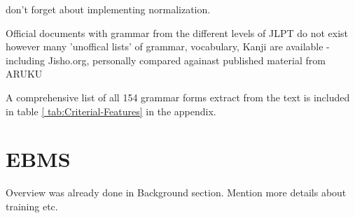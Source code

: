 don't forget about implementing normalization.

Official documents with grammar from the different levels of JLPT do not exist however many 'unoffical lists' of
grammar, vocabulary, Kanji are available - including Jisho.org, personally compared againast published material from
ARUKU

A comprehensive list of all 154 grammar forms extract from the text is included in table \ref{
tab:Criterial-Features} in the appendix.


\section{EBMS}

 Overview was already done in Background section. Mention more details about training etc.


